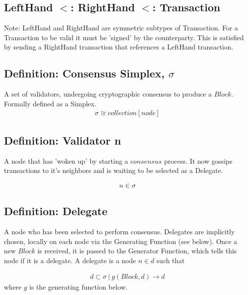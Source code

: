 \documentclass{article}
\begin{document}
\subsection{LeftHand $<$: RightHand $<$: Transaction}
Note: LeftHand and RightHand are symmetric subtypes of Transaction. For a Transaction to be valid it must be 'signed' by the counterparty. This is satisfied by sending a RightHand transaction that references a LeftHand transaction.

\subsection{Definition: Consensus Simplex, $\sigma$}
A set of validators, undergoing cryptographic consensus to produce a $Block$. Formally defined as a Simplex.
\begin{equation} \label{eq1}
\begin{split}
\sigma \cong collection[node]
\end{split}
\end{equation}

\subsection{Definition: Validator n}
A node that has 'woken up' by starting a $consensus$ process. It now gossips transactions to it's neighbors and is waiting to be selected as a Delegate.

\begin{equation} \label{eq1}
\begin{split}
n \in \sigma
\end{split}
\end{equation}

\subsection{Definition: Delegate}
A node who has been selected to perform consensus. Delegates are implicitly chosen, locally on each node via the Generating Function (see below). Once a new $Block$ is received, it is passed to the Generator Function, which tells this node if it is a delegate. A delegate is a node $n \in d$ such that

\begin{equation} \label{eq1}
\begin{split}
d \subset \sigma \ | \ g(Block, d) \rightarrow d
\end{split}
\end{equation}
where $g$ is the generating function below.
\end{document}
